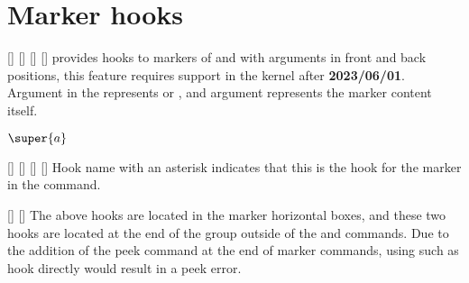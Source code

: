 \documentclass[load-preamble+]{cnltx-doc}
\begin{document}
\section{Marker hooks}
\begin{commands}\setlength{\itemsep}{0pt}
  []\nonl
  []\nonl
  []\nonl
  []%
   provides hooks to markers of  and  with arguments in front and back positions, this feature requires support in the  kernel after \textbf{2023/06/01}. Argument  in the  represents  or , and argument  represents the marker content itself.
\begin{demohigh}
$\super{a}$
\end{demohigh}
\end{commands}
\begin{commands}\setlength{\itemsep}{0pt}
  []\nonl
  []\nonl
  []\nonl
  []
  Hook name with an asterisk indicates that this is the hook for the marker in the  command.
\end{commands}
\begin{commands}\setlength{\itemsep}{0pt}
  []\nonl
  []
  The above hooks are located in the marker horizontal boxes, and these two hooks are located at the end of the group outside of the  and  commands. Due to the addition of the peek command at the end of marker commands, using such as  hook directly would result in a peek error.
\end{commands}
\end{document}
